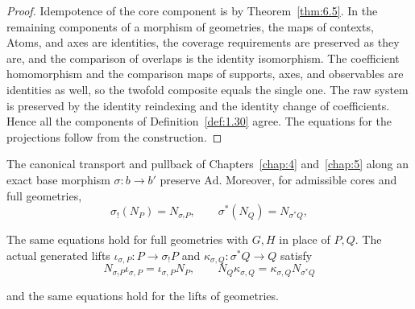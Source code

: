 \begin{proof}

Idempotence of the core component is by Theorem~\ref{thm:6.5}.
In the remaining components of a morphism of geometries, the maps of contexts, Atoms, and
axes are identities, the coverage requirements are preserved as they are, and the
comparison of overlaps is the identity isomorphism.
The coefficient homomorphism and the comparison maps of supports, axes, and observables are
identities as well, so the twofold composite equals the single one.
The raw system is preserved by the identity reindexing and the identity change of
coefficients.
Hence all the components of Definition~\ref{def:1.30} agree. The equations for the
projections follow from the construction.

\end{proof}

\begin{lemma}\label{lem:6.15}

The canonical transport and pullback of Chapters~\ref{chap:4} and~\ref{chap:5}
along an exact base morphism $\sigma:b\to b'$ preserve $\mathrm{Ad}$.
Moreover, for admissible cores and full geometries,
\begin{equation*}
\sigma_!(N_P)=N_{\sigma_!P},\qquad
\sigma^*(N_Q)=N_{\sigma^*Q},
\tag{6.16}\label{eq:6.16}
\end{equation*}

The same equations hold for full geometries with $G,H$ in place of $P,Q$.
The actual generated lifts $\iota_{\sigma,P}:P\to\sigma_!P$ and
$\kappa_{\sigma,Q}:\sigma^*Q\to Q$ satisfy
\begin{equation*}
N_{\sigma_!P}\iota_{\sigma,P}=\iota_{\sigma,P}N_P,
\qquad
N_Q\kappa_{\sigma,Q}=\kappa_{\sigma,Q}N_{\sigma^*Q}
\tag{6.17}\label{eq:6.17}
\end{equation*}

and the same equations hold for the lifts of geometries.

\end{lemma}

